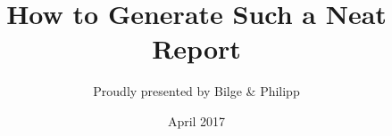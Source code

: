 \documentclass[bibliography=totocnumbered]{scrreprt}
\begin{document}
\title{How to Generate Such a Neat Report}
\author{Proudly presented by Bilge \& Philipp}
\date{April 2017}
\maketitle

\tableofcontents 













\begin{comment}
\end{comment}
\end{document}
